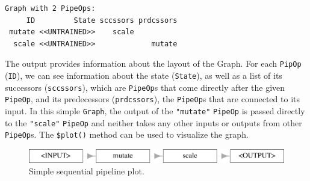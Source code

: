 \begin{Shaded}
\begin{Highlighting}[]
\OtherTok{=} \NormalTok{(}\NormalTok{,}
   \NormalTok{(} \SpecialCharTok{\textasciitilde{}}\SpecialCharTok{/}
\NormalTok{)}
\OtherTok{=} \NormalTok{(}\NormalTok{)}
\OtherTok{=}\SpecialCharTok{\%\textgreater{}\textgreater{}\%}
\end{Highlighting}
\end{Shaded}

\begin{verbatim}
Graph with 2 PipeOps:
     ID         State sccssors prdcssors
 mutate <<UNTRAINED>>    scale          
  scale <<UNTRAINED>>             mutate
\end{verbatim}

The output provides information about the layout of the Graph. For each
\texttt{PipOp} (\texttt{ID}), we can see information about the state
(\texttt{State}), as well as a list of its successors
(\texttt{sccssors}), which are \texttt{PipeOp}s that come directly after
the given \texttt{PipeOp}, and its predecessors (\texttt{prdcssors}),
the \texttt{PipeOp}s that are connected to its input. In this simple
\texttt{Graph}, the output of the \texttt{"mutate"} \texttt{PipeOp} is
passed directly to the \texttt{"scale"} \texttt{PipeOp} and neither
takes any other inputs or outputs from other \texttt{PipeOp}s. The
\texttt{\$plot()}
method can be used to visualize the graph.

\begin{Shaded}
\begin{Highlighting}[]
\SpecialCharTok{$}\NormalTok{(} \NormalTok{)}
\end{Highlighting}
\end{Shaded}

\begin{figure}

{\centering \includegraphics[width=1\textwidth,height=\textheight]{chapters/chapter7/sequential_pipelines_files/figure-pdf/fig-pipelines-basic-plot-1.png}

}

\caption{\label{fig-pipelines-basic-plot}Simple sequential pipeline
plot.}

\end{figure}

